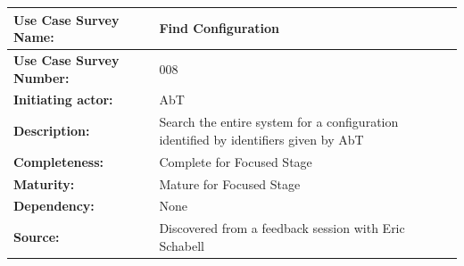 \begin{center}
\begin{tabularx}{\linewidth}{|l|p{7.08cm}|}
\hline
\textbf{Use Case Survey Name:} & Find Configuration \\
\hline
\textbf{Use Case Survey Number:} & 008 \\
\hline
\textbf{Initiating actor:} & AbT \\
\hline
\textbf{Description:} & Search the entire system for a configuration identified by identifiers given by AbT \\
\hline
\textbf{Completeness:} & Complete for Focused Stage \\
\hline
\textbf{Maturity:} & Mature for Focused Stage \\
\hline
\textbf{Dependency:} & None \\
\hline
\textbf{Source:} & Discovered from a feedback session with Eric Schabell \\
\hline
\end{tabularx}
\end{center}
